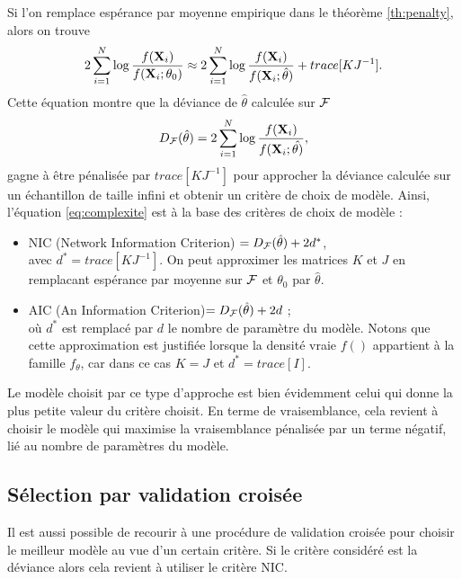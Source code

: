 Si l'on remplace esp\'erance par moyenne empirique dans le th\'eor\`eme \ref{th:penalty},
alors on trouve
\begin{equation}
\label{eq:complexite}
2 \sum_{i=1}^{N} \log \frac{f(\mbox{\bf X}_i)}{f(\mbox{\bf X}_i ; \theta_0)} \approx 2 \sum_{i=1}^{N} \log \frac{f(\mbox{\bf X}_i)}{f(\mbox{\bf X}_i ; \hat{\theta})}
+ trace[KJ^{-1}].
\end{equation}
Cette \'equation montre que la d\'eviance de $\hat{\theta}$ calcul\'ee sur 
${\cal F}$
$$
D_{\cal F}(\hat{\theta})=2 \sum_{i=1}^{N} \log \frac{f(\mbox{\bf X}_i)}{f(\mbox{\bf X}_i ; \hat{\theta)}},
$$ 
gagne \`a \^etre p\'enalis\'ee  par $trace[KJ^{-1}]$ pour approcher la d\'eviance
calcul\'ee sur un \'echantillon de taille infini et  obtenir un crit\`ere de choix 
de mod\`ele. Ainsi, l'\'equation \ref{eq:complexite} est \`a la base des crit\`eres
de choix de mod\`ele :
\begin{itemize}
\item NIC (Network Information Criterion) $= D_{\cal F}(\hat{\theta}) + 2d^*$, \\
avec $d^*=trace[KJ^{-1}]$. On peut approximer les matrices $K$ et 
$J$ en remplacant esp\'erance par moyenne sur ${\cal F}$ et $\theta_0$ par
$\hat{\theta}$.
\item AIC (An Information Criterion)$ = D_{\cal F}(\hat{\theta}) + 2d$ ; \\
o\`u $d^*$ est remplac\'e par $d$ le nombre de param\`etre du mod\`ele. 
Notons que cette approximation est justifi\'ee lorsque la densit\'e vraie
$f()$ appartient \`a la famille $f_{\theta}$, car dans ce cas $K=J$ et
$d^*=trace[I]$.
\end{itemize}

Le mod\`ele choisit par ce type d'approche est bien \'evidemment celui 
qui donne la plus petite valeur du crit\`ere choisit. En terme de vraisemblance,
cela revient \`a choisir le mod\`ele qui maximise la vraisemblance p\'enalis\'ee
par un terme n\'egatif, li\'e au nombre de param\`etres du mod\`ele.
 
\subsection{S\'election par  validation crois\'ee}

Il est aussi possible de recourir \`a  une proc\'edure de validation
crois\'ee pour choisir le meilleur mod\`ele au vue d'un 
certain crit\`ere. Si le crit\`ere consid\'er\'e est la d\'eviance
alors cela revient \`a utiliser le crit\`ere NIC.


